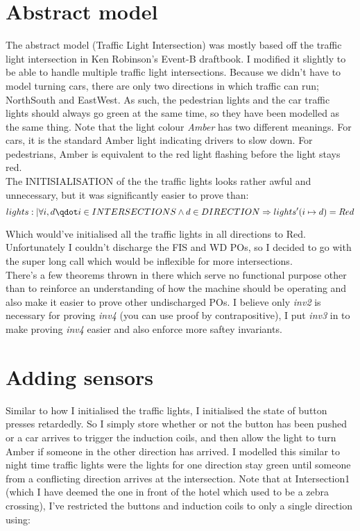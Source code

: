 \documentclass[a4paper]{article}
\begin{document}
\section{Abstract model}
The abstract model (Traffic Light Intersection) was mostly based off the traffic light intersection in Ken Robinson's Event-B draftbook. I modified it slightly to be able to handle multiple traffic light intersections. Because we didn't have to model turning cars, there are only two directions in which traffic can run; NorthSouth and EastWest. As such, the pedestrian lights and the car traffic lights should always go green at the same time, so they have been modelled as the same thing. Note that the light colour \textit{Amber} has two different meanings. For cars, it is the standard Amber light indicating drivers to slow down. For pedestrians, Amber is equivalent to the red light flashing before the light stays red.\\
The INITISIALISATION of the the traffic lights looks rather awful and unnecessary, but it was significantly easier to prove than:
\begin{equation}
lights :| \forall i, d \qdot i \in INTERSECTIONS \wedge d \in DIRECTION \Rightarrow lights'(i \mapsto d) = Red
\end{equation}

Which would've initialised all the traffic lights in all directions to Red. Unfortunately I couldn't discharge the FIS and WD POs, so I decided to go with the super long call which would be inflexible for more intersections.\\

There's a few theorems thrown in there which serve no functional purpose other than to reinforce an understanding of how the machine should be operating and also make it easier to prove other undischarged POs. I believe only \textit{inv2} is necessary for proving \textit{inv4} (you can use proof by contrapositive), I put \textit{inv3} in to make proving \textit{inv4} easier and also enforce more saftey invariants.

\section{Adding sensors}
Similar to how I initialised the traffic lights, I initialised the state of button presses retardedly. So I simply store whether or not the button has been pushed or a car arrives to trigger the induction coils, and then allow the light to turn Amber if someone in the other direction has arrived. I modelled this similar to night time traffic lights were the lights for one direction stay green until someone from a conflicting direction arrives at the intersection. Note that at Intersection1 (which I have deemed the one in front of the hotel which used to be a zebra crossing), I've restricted the buttons and induction coils to only a single direction using:
\end{document}
